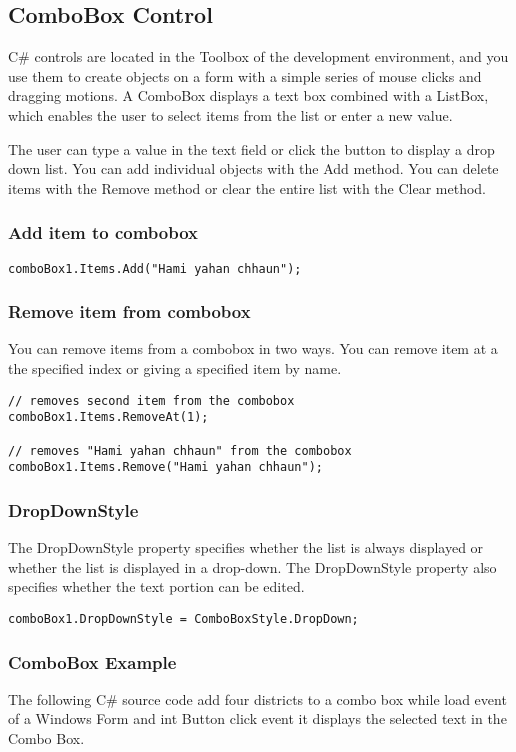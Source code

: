 \subsection{ComboBox Control }
C\# controls are located in the Toolbox of the development environment, and you use them to create objects on a form with a simple series of mouse clicks and dragging motions. A ComboBox displays a text box combined with a ListBox, which enables the user to select items from the list or enter a new value.

The user can type a value in the text field or click the button to display a drop down list. You can add individual objects with the Add method. You can delete items with the Remove method or clear the entire list with the Clear method.

\subsubsection*{Add item to combobox}
\begin{lstlisting}[numbers=none]
comboBox1.Items.Add("Hami yahan chhaun");
\end{lstlisting}

\subsubsection*{Remove item from combobox}
You can remove items from a combobox in two ways. You can remove item at a the specified index or giving a specified item by name.

\begin{lstlisting}[numbers=none]
// removes second item from the combobox
comboBox1.Items.RemoveAt(1);

// removes "Hami yahan chhaun" from the combobox
comboBox1.Items.Remove("Hami yahan chhaun");
\end{lstlisting}

\subsubsection*{DropDownStyle }
The DropDownStyle property specifies whether the list is always displayed or whether the list is displayed in a drop-down. The DropDownStyle property also specifies whether the text portion can be edited.
\begin{lstlisting}[numbers=none]
comboBox1.DropDownStyle = ComboBoxStyle.DropDown;
\end{lstlisting}

\subsubsection*{ComboBox Example}
The following C\# source code add four districts to a combo box while load event of a Windows Form and int Button click event it displays the selected text in the Combo Box.


